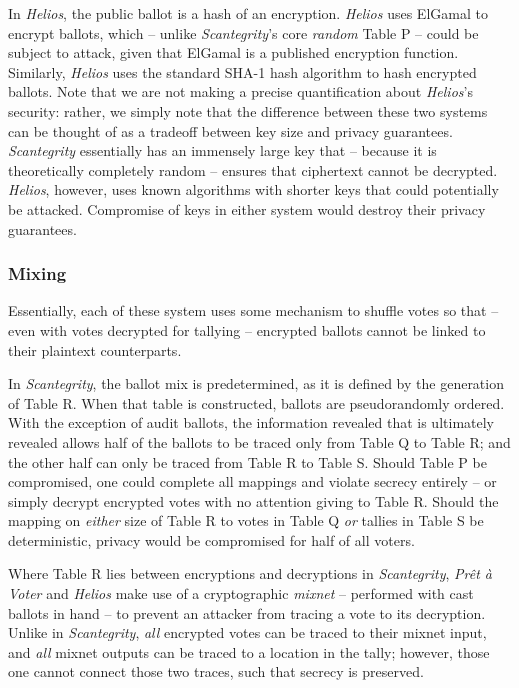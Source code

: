 \documentclass[10pt,twocolumn]{article}
\newcommand{\term}[1]{\textit{#1}}
\newcommand{\preta}{Pr\^{e}t \`{a}}
\newcommand{\pv}{\preta{} Voter}
\begin{document}
In \term{Helios}, the public ballot is a hash of an encryption. \term{Helios} uses ElGamal to encrypt ballots,
which -- unlike \term{Scantegrity}'s core \emph{random} Table P -- could be subject to attack, given that
ElGamal is a published encryption function. Similarly, \term{Helios} uses the standard SHA-1 hash algorithm
to hash encrypted ballots. Note that we are not making a precise quantification about \term{Helios}'s
security: rather, we simply note that the difference between these two systems can be thought of as
a tradeoff between key size and privacy guarantees. \term{Scantegrity} essentially has an immensely large
key that -- because it is theoretically completely random -- ensures that ciphertext cannot be
decrypted. \term{Helios}, however, uses known algorithms with shorter keys that could potentially be
attacked. Compromise of keys in either system would destroy their privacy guarantees.

\subsubsection{Mixing}

Essentially, each of these system uses some mechanism to shuffle votes so that -- even
with votes decrypted for tallying -- encrypted ballots cannot be linked to their plaintext
counterparts.

In \term{Scantegrity}, the ballot mix is predetermined, as it is defined by the generation of Table R.
When that table is constructed, ballots are pseudorandomly ordered. With the exception of audit
ballots, the information revealed that is ultimately revealed allows half of the ballots to be
traced only from Table Q to Table R; and the other half can only be traced from Table R to Table S.
Should Table P be compromised, one could complete all mappings and violate secrecy entirely -- or
simply decrypt encrypted votes with no attention giving to Table R. Should the mapping on
\emph{either} size of Table R to votes in Table Q \emph{or} tallies in Table S be deterministic,
privacy would be compromised for half of all voters.

Where Table R lies between encryptions and decryptions in \term{Scantegrity}, \term{\pv{}} and \term{Helios} make use of a
cryptographic \term{mixnet} -- performed with cast ballots in hand -- to prevent an attacker from
tracing a vote to its decryption. Unlike in \term{Scantegrity}, \emph{all} encrypted votes can be traced to
their mixnet input, and \emph{all} mixnet outputs can be traced to a location in the tally; however,
those one cannot connect those two traces, such that secrecy is preserved.
\end{document}
